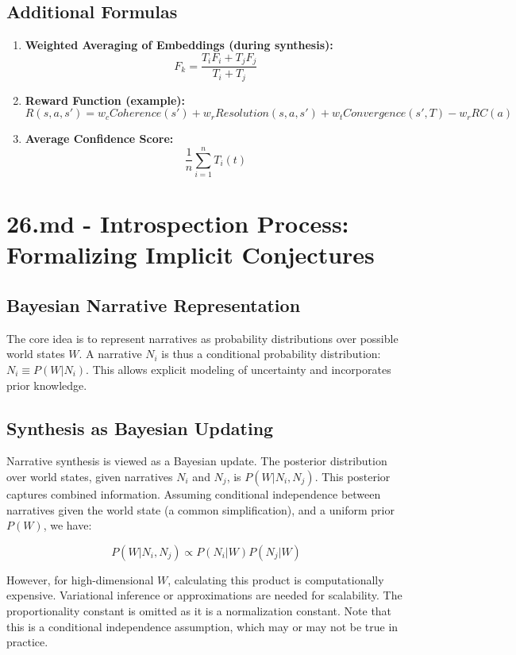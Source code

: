 \documentclass[12pt, a4paper]{article}
\begin{document}
\subsection{Additional Formulas}

\begin{enumerate}
    \item \textbf{Weighted Averaging of Embeddings (during synthesis): }
    \[
    F_k = \frac{T_i F_i + T_j F_j}{T_i + T_j}
    \]
    \item \textbf{Reward Function (example): }
    \[
    R(s, a, s') = w_c Coherence(s') + w_r Resolution(s, a, s') + w_t Convergence(s', T) - w_r RC(a)
    \]
    \item \textbf{Average Confidence Score: }
    \[
    \frac{1}{n} \sum_{i=1}^n T_i(t)
    \]
\end{enumerate}
 







\section{26.md - Introspection Process: Formalizing Implicit Conjectures}

\subsection{Bayesian Narrative Representation}

The core idea is to represent narratives as probability distributions over possible world states $W$.  A narrative $N_i$ is thus a conditional probability distribution: $N_i \equiv P(W|N_i)$. This allows explicit modeling of uncertainty and incorporates prior knowledge.

\subsection{Synthesis as Bayesian Updating}

Narrative synthesis is viewed as a Bayesian update. The posterior distribution over world states, given narratives $N_i$ and $N_j$, is $P(W|N_i, N_j)$. This posterior captures combined information. Assuming conditional independence between narratives given the world state (a common simplification), and a uniform prior $P(W)$, we have:

\[
P(W|N_i, N_j) \propto P(N_i|W)P(N_j|W)
\]

However, for high-dimensional $W$, calculating this product is computationally expensive. Variational inference or approximations are needed for scalability.  The proportionality constant is omitted as it is a normalization constant. Note that this is a conditional independence assumption, which may or may not be true in practice.
\end{document}
